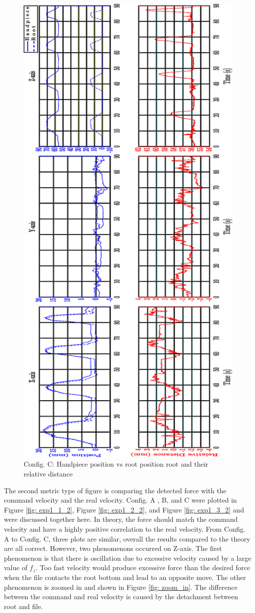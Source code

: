 \begin{figure}[htbp]
\begin{center}
\includegraphics[width=0.7\linewidth]{Images/exp/ConfigC_1.eps}
\caption{Config. C: Handpiece position vs root position root and their relative distance}
\label{fig: exp1_3_1}
\end{center}
\end{figure}		
\par 
The second metric type of figure is comparing the detected force with the command velocity and the real velocity. Config. A , B, and C were plotted in Figure \ref{fig: exp1_1_2}, Figure \ref{fig: exp1_2_2}, and Figure \ref{fig: exp1_3_2} and were discussed together here. In theory, the force should match the command velocity and have a highly positive correlation to the real velocity. From Config. A to Config. C, three plots are similar, overall the results compared to the theory are all correct. However, two phenomenons occurred on Z-axis. The first phenomenon is that there is oscillation due to excessive velocity caused by a large value of $f_z$. Too fast velocity would produce excessive force than the desired force when the file contacts the root bottom and lead to an opposite move. The other phenomenon is zoomed in and shown in Figure \ref{fig: zoom_in}. The difference between the command and real velocity is caused by the detachment between root and file.

